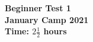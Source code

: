 \usepackage{mathtools,amsfonts}
\usepackage{enumerate}
\usepackage{fullpage}
\usepackage{array}
\usepackage{fancyvrb}


\thispagestyle{empty}

\begin{center}
  \textbf{\Large Beginner Test 1}
  \\ \vspace{1em}
  \textbf{\large January Camp 2021}
  \\ \vspace{1em}
  \textbf{\large Time: $2\frac{1}{2}$ hours}
\end{center}

\vspace{24pt}

